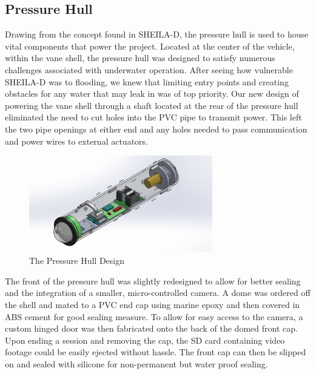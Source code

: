 \documentclass{report}
\begin{document}
\subsection{Pressure Hull}
Drawing from the concept found in SHEILA-D, the pressure hull is used to house vital components that power the project.  Located at the center of the vehicle, within the vane shell, the pressure hull was designed to satisfy numerous challenges associated with underwater operation.  After seeing how vulnerable SHEILA-D was to flooding, we knew that limiting entry points and creating obstacles for any water that may leak in was of top priority.  Our new design of powering the vane shell through a shaft located at the rear of the pressure hull eliminated the need to cut holes into the PVC pipe to transmit power.  This left the two pipe openings at either end and any holes needed to pass communication and power wires to external actuators.
\begin{figure}[H]
\centering
\includegraphics[width=8cm]{"Pressure Hull"}
\caption{The Pressure Hull Design}
\end{figure}
The front of the pressure hull was slightly redesigned to allow for better sealing and the integration of a smaller, micro-controlled camera.  A dome was ordered off the shell and mated to a PVC end cap using marine epoxy and then covered in ABS cement for good sealing measure.  To allow for easy access to the camera, a custom hinged door was then fabricated onto the back of the domed front cap.  Upon ending a session and removing the cap, the SD card containing video footage could be easily ejected without hassle.  The front cap can then be slipped on and sealed with silicone for non-permanent but water proof sealing.
\end{document}
